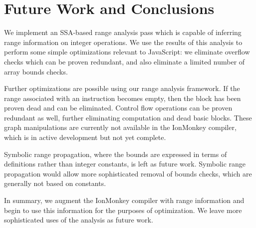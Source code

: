 \documentclass{article}
\begin{document}
\section{Future Work and Conclusions}
We implement an SSA-based range analysis pass which is capable of inferring
range information on integer operations. We use the results of this analysis to
perform some simple optimizations relevant to JavaScript: we eliminate overflow
checks which can be proven redundant, and also eliminate a limited number of
array bounds checks.

Further optimizations are possible using our range analysis framework. If the
range associated with an instruction becomes empty, then the block has been
proven dead and can be eliminated. Control flow operations can be proven
redundant as well, further eliminating computation and dead basic blocks. These
graph manipulations are currently not available in the IonMonkey compiler,
which is in active development but not yet complete.

Symbolic range propagation, where the bounds are expressed in terms of
definitions rather than integer constants, is left as future work. Symbolic
range propagation would allow more sophisticated removal of bounds checks,
which are generally not based on constants.

In summary, we augment the IonMonkey compiler with range information and begin
to use this information for the purposes of optimization. We leave more
sophisticated uses of the analysis as future work.

{}

\end{document}
